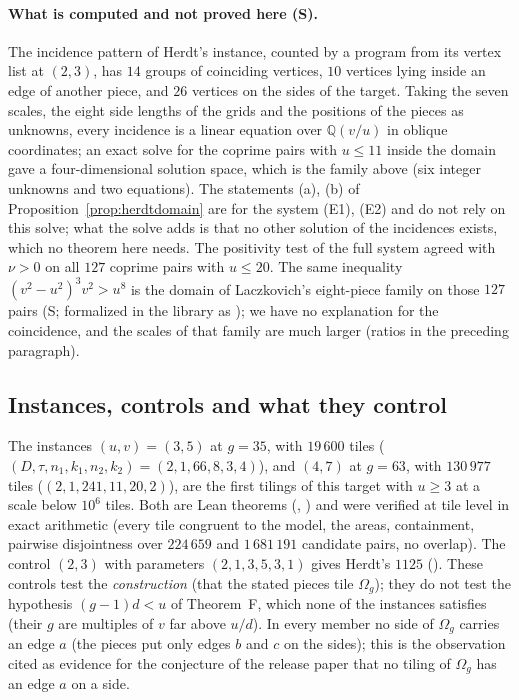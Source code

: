 \documentclass[11pt,reqno]{amsart}
\theoremstyle{plain}
\theoremstyle{definition}
\newcommand{\Q}{\mathbb{Q}}
\newcommand{\sS}{\textup{\textsf{S}}}
\begin{document}
\paragraph{What is computed and not proved here (\sS).} The incidence pattern of Herdt's instance, counted by a program from its vertex list at $(2,3)$, has $14$ groups of coinciding vertices, $10$ vertices lying inside an edge of another piece, and $26$ vertices on the sides of the target. Taking the seven scales, the eight side lengths of the grids and the positions of the pieces as unknowns, every incidence is a linear equation over $\Q(v/u)$ in oblique coordinates; an exact solve for the coprime pairs with $u\le11$ inside the domain gave a four-dimensional solution space, which is the family above (six integer unknowns and two equations). The statements \textup{(a)}, \textup{(b)} of Proposition~\ref{prop:herdtdomain} are for the system (E1), (E2) and do not rely on this solve; what the solve adds is that no other solution of the incidences exists, which no theorem here needs. The positivity test of the full system agreed with $\nu >0$ on all $127$ coprime pairs with $u\le20$.
The same inequality $(v^2-u^2)^3v^2>u^8$ is the domain of Laczkovich's eight-piece family on those $127$ pairs (\sS; formalized in the library as ); we have no explanation for the coincidence, and the scales of that family are much larger (ratios in the preceding paragraph).

\subsection{Instances, controls and what they control}
The instances $(u,v)=(3,5)$ at $g=35$, with $19\,600$ tiles ($(D,\tau,n_1,k_1,n_2,k_2)=(2,1,66,8,3,4)$), and $(4,7)$ at $g=63$, with $130\,977$ tiles ($(2,1,241,11,20,2)$), are the first tilings of
this target with $u\ge3$ at a scale below $10^6$ tiles. Both are Lean theorems (, ) and were verified at tile level in exact arithmetic (every tile congruent to the model, the areas, containment, pairwise disjointness over $224\,659$ and $1\,681\,191$ candidate pairs, no overlap). The control $(2,3)$ with parameters $(2,1,3,5,3,1)$ gives Herdt's $1125$ ().
These controls test the \emph{construction} (that the stated pieces tile $\Omega_{g}$); they do not test the hypothesis $(g-1)d<u$ of Theorem~F, which none of the instances satisfies (their $g$ are multiples of $v$ far above $u/d$).
In every member no side of $\Omega_{g}$ carries an edge $a$ (the pieces put only edges $b$ and $c$ on the sides); this is the observation cited as evidence for the conjecture of the release paper that no tiling of $\Omega_{g}$ has an edge $a$ on a side.
\end{document}
